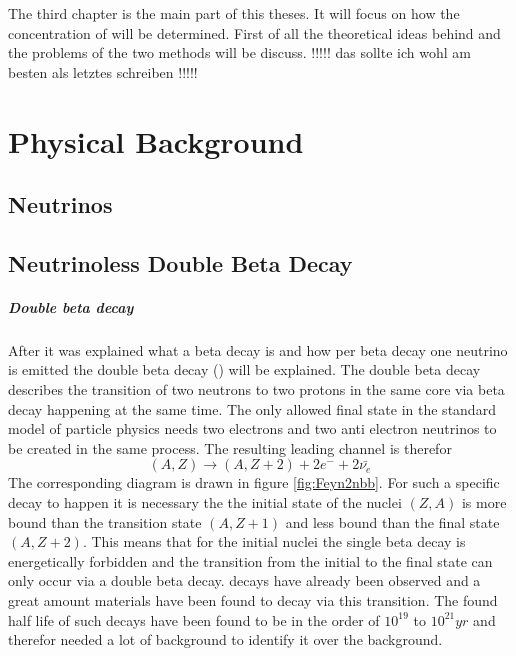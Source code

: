 The third chapter is the main part of this theses. 
It will focus on how the concentration of \Kr will be determined. 
First of all the theoretical ideas behind and the problems of the two methods will be discuss. !!!!! das sollte ich wohl am besten als letztes schreiben !!!!!


\chapter{Physical Background}
\label{sec:PhyBG}

\section{Neutrinos}




\section{Neutrinoless Double Beta Decay}
\label{sec:0nubetabeta}

\paragraph{Double beta decay}

After it was explained what a beta decay is and how per beta decay one neutrino is emitted the double beta decay (\twonu) will be explained.
The double beta decay describes the transition of two neutrons to two protons in the same core via beta decay happening at the same time.
The only allowed final state in the standard model of particle physics needs two electrons and two anti electron neutrinos to be created in the same process.
The resulting leading channel is therefor
\begin{equation}
(A,Z)\rightarrow (A,Z+2) + 2e^- + 2\bar{\nu_e}
\end{equation} 
The corresponding diagram is drawn in figure \ref{fig:Feyn2nbb}.
For such a specific decay to happen it is necessary the the initial state of the nuclei $(Z,A)$ is more bound than the transition state $(A,Z+1)$ and less bound than the final state $(A,Z+2)$.
This means that for the initial nuclei the single beta decay is energetically forbidden and the transition from the initial to the final state can only occur via a double beta decay.
\twonu  decays have already been observed and a great amount materials have been found to decay via this transition.
The found half life of such decays have been found to be in the order of $10^{19}$ to $10^{21} \unit{yr}$ and therefor needed a lot of background to identify it over the background.
\\

